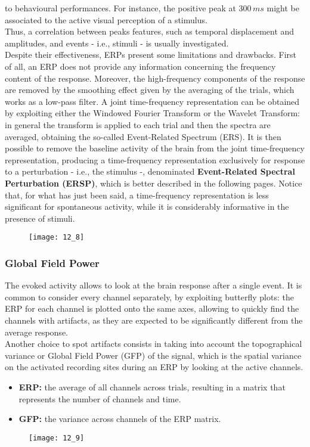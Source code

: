 to behavioural performances. For instance, the positive peak at \(300\,ms\) might be associated
to the active visual perception of a stimulus.\\
Thus, a correlation between peaks features, such as temporal displacement and amplitudes,
and events - i.e., stimuli - is usually investigated.\\
Despite their effectiveness, ERPs present some limitations and drawbacks. First of all, an
ERP does not provide any information concerning the frequency content of the response.
Moreover, the high-frequency components of the response are removed by the smoothing effect
given by the averaging of the trials, which works as a low-pass filter. A joint time-frequency
representation can be obtained by exploiting either the Windowed Fourier Transform or the
Wavelet Transform: in general the transform is applied to each trial and then the spectra
are averaged, obtaining the so-called Event-Related Spectrum (ERS). It is then possible
to remove the baseline activity of the brain from the joint time-frequency representation,
producing a time-frequency representation exclusively for response to a perturbation
- i.e., the stimulus -, denominated \textbf{Event-Related Spectral Perturbation (ERSP)}, which is
better described in the following pages.
Notice that, for what has just been said, a time-frequency representation is less significant
for spontaneous activity, while it is considerably informative in the presence of stimuli.
\begin{figure}[H]
    \centering
    \texttt{[image: 12\_8]}
\end{figure}
\subsubsection{Global Field Power}
The evoked activity allows to look at the brain response after a single event. It is
common to consider every channel separately, by exploiting butterfly plots: the ERP for
each channel is plotted onto the same axes, allowing to quickly find the channels with
artifacts, as they are expected to be significantly different from the average response.\\
Another choice to spot artifacts consists in taking into account the topographical variance
or Global Field Power (GFP) of the signal, which is the spatial variance on the activated
recording sites during an ERP by looking at the active channels.
\begin{itemize}
    \item \textbf{ERP:} the average of all channels across trials, resulting in a matrix that
          represents the number of channels and time.
    \item \textbf{GFP:} the variance across channels of the ERP matrix.
\end{itemize}
\begin{figure}[H]
    \centering
    \texttt{[image: 12\_9]}
\end{figure}
